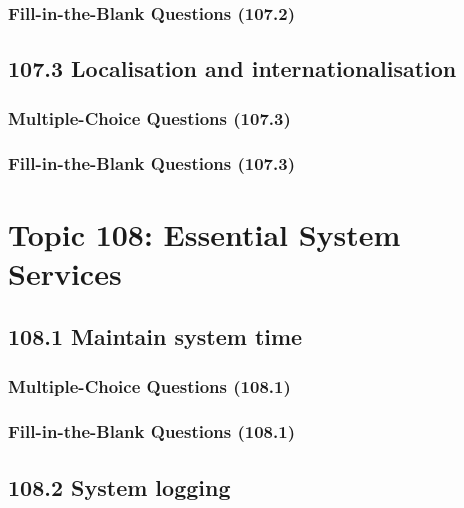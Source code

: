 \documentclass[a4paper]{report}
\begin{document}
\subsubsection*{Fill-in-the-Blank Questions (107.2)}

\subsection*{107.3 Localisation and internationalisation}
\subsubsection*{Multiple-Choice Questions (107.3)}

\subsubsection*{Fill-in-the-Blank Questions (107.3)}


\section*{Topic 108: Essential System Services}

\subsection*{108.1 Maintain system time}
\subsubsection*{Multiple-Choice Questions (108.1)}

\subsubsection*{Fill-in-the-Blank Questions (108.1)}

\subsection*{108.2 System logging}
\end{document}

